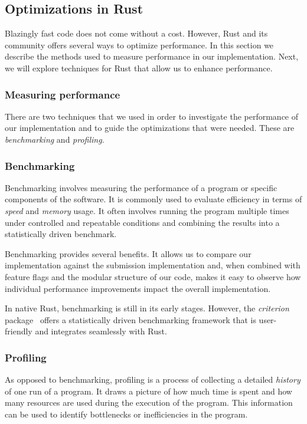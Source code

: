 \documentclass[11pt]{report}
\theoremstyle{definition}
\theoremstyle{plain}
\begin{document}
\subsection{Optimizations in Rust}\label{sub:rust_optimizations}
Blazingly fast code does not come without a cost. However, Rust and its community offers several ways to optimize performance. In this section we describe the methods used to measure performance in our implementation. Next, we will explore techniques for Rust that allow us to enhance performance.

\subsubsection*{Measuring performance}\label{sec:rust_benchmarking}
There are two techniques that we used in order to investigate the performance of our implementation and  to guide the optimizations that were needed. These are \textit{benchmarking} and \textit{profiling}.

\subsubsection{Benchmarking}
Benchmarking involves measuring the performance of a program or specific components of the software. It is commonly used to evaluate efficiency in terms of \textit{speed} and \textit{memory} usage. It often involves running the program multiple times under controlled and repeatable conditions and combining the results into a statistically driven benchmark.

Benchmarking provides several benefits. It allows us to compare our implementation against the submission implementation and, when combined with feature flags and the modular structure of our code, makes it easy to observe how individual performance improvements impact the overall implementation.

In native Rust, benchmarking is still in its early stages. However, the \textit{criterion} package~\cite{criterion} offers a statistically driven benchmarking framework that is user-friendly and integrates seamlessly with Rust.

\subsubsection{Profiling}
As opposed to benchmarking, profiling is a process of collecting a detailed \textit{history} of one run of a program. It draws a picture of how much time is spent and how many resources are used during the execution of the program. This information can be used to identify bottlenecks or inefficiencies in the program.
\end{document}
